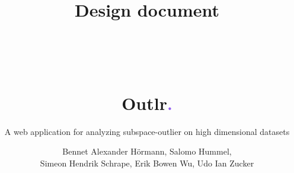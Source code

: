 \documentclass[11pt, english]{scrartcl}
\title{Design document\\~\\~\\~\\{\myfont Outlr\textcolor[HTML]{925FF0}{.}}}
\subtitle{A web application for analyzing subspace-outlier on high dimensional datasets}
\author{Bennet Alexander Hörmann, Salomo Hummel,\\
Simeon Hendrik Schrape, Erik Bowen Wu, Udo Ian Zucker}
\begin{document}
\maketitle\pagebreak

\tableofcontents\pagebreak















\begin{appendices}

\printglossary\clearpage
\printglossary[type=\acronymtype]\clearpage %



\end{appendices}
\end{document}
